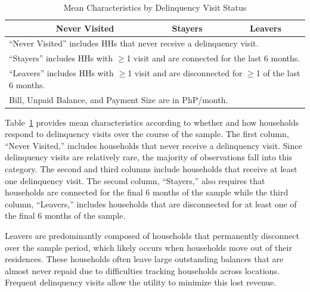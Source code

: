 \documentclass[12pt]{article}
\begin{document}
\begin{table}[h!]
\centering
\caption{Mean Characteristics by Delinquency Visit Status}\label{table:descriptives_3g}
\vspace{-2mm}
\begin{tabular}{l*{1}{ccc}}
\toprule
 & Never Visited & Stayers & Leavers  \\
\midrule

\bottomrule
\multicolumn{4}{l}{\scriptsize ``Never Visited'' includes HHs that never receive a delinquency visit.}\\  [-.5em]
\multicolumn{4}{l}{\scriptsize ``Stayers'' includes HHs with $\geq$1 visit and are connected for the last 6 months.}\\ [-.5em]
\multicolumn{4}{l}{\scriptsize ``Leavers'' includes HHs with $\geq$1 visit and are disconnected for $\geq$1 of the last 6 months.}\\ [-.5em]
\multicolumn{4}{l}{\scriptsize Bill, Unpaid Balance, and Payment Size are in PhP/month.} 
\end{tabular}
\end{table}

Table~\ref{table:descriptives_3g} provides mean characteristics according to whether and how households respond to delinquency visits over the course of the sample.  The first column, ``Never Visited,'' includes households that never receive a delinquency visit.  Since delinquency visits are relatively rare, the majority of observations fall into this category.  The second and third columns include households that receive at least one delinquency visit.   The second column, ``Stayers,'' also requires that households are connected for the final 6 months of the sample while the third column, ``Leavers,'' includes households that are disconnected for at least one of the final 6 months of the sample.  

Leavers are predominantly composed of households that permanently disconnect over the sample period, which likely occurs when households move out of their residences.  These households often leave large outstanding balances that are almost never repaid due to difficulties tracking households across locations.  Frequent delinquency visits allow the utility to minimize this lost revenue.  %
\end{document}
